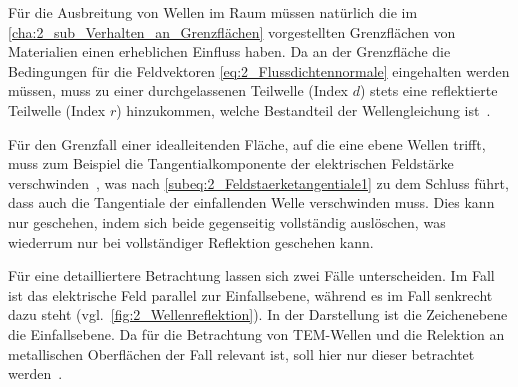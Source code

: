 Für die Ausbreitung von Wellen im Raum müssen natürlich die im \Abschnitt \ref{cha:2_sub_Verhalten_an_Grenzflächen} vorgestellten Grenzflächen von Materialien einen erheblichen Einfluss haben. Da an der Grenzfläche die Bedingungen für die Feldvektoren \Gleichungen \eqref{eq:2_Flussdichtennormale} eingehalten werden müssen, muss zu einer durchgelassenen Teilwelle (Index \glqq$d$\grqq) stets eine reflektierte Teilwelle (Index \glqq$r$\grqq) hinzukommen, welche Bestandteil der Wellengleichung ist~\cite{EM_Schirmung}.
\par
\vspace{\linespace}
Für den Grenzfall einer idealleitenden Fläche, auf die eine ebene Wellen trifft, muss zum Beispiel die Tangentialkomponente der elektrischen Feldstärke verschwinden~\cite{EM_Schirmung}, was nach \Gleichung \eqref{subeq:2_Feldstaerketangentiale1} zu dem Schluss führt, dass auch die Tangentiale der einfallenden Welle verschwinden muss. Dies kann nur geschehen, indem sich beide gegenseitig vollständig auslöschen, was wiederrum nur bei vollständiger Reflektion geschehen kann.
\par
\vspace{\linespace}
Für eine detailliertere Betrachtung lassen sich zwei Fälle unterscheiden. Im Fall  ist das elektrische Feld parallel zur Einfallsebene, während es im Fall  senkrecht dazu steht (vgl.~\Abb \ref{fig:2_Wellenreflektion}). In der Darstellung ist die Zeichenebene die Einfallsebene. Da für die Betrachtung von TEM-Wellen und die Relektion an metallischen Oberflächen der Fall  relevant ist, soll hier nur dieser betrachtet werden~\cite{EM_Schirmung}.

